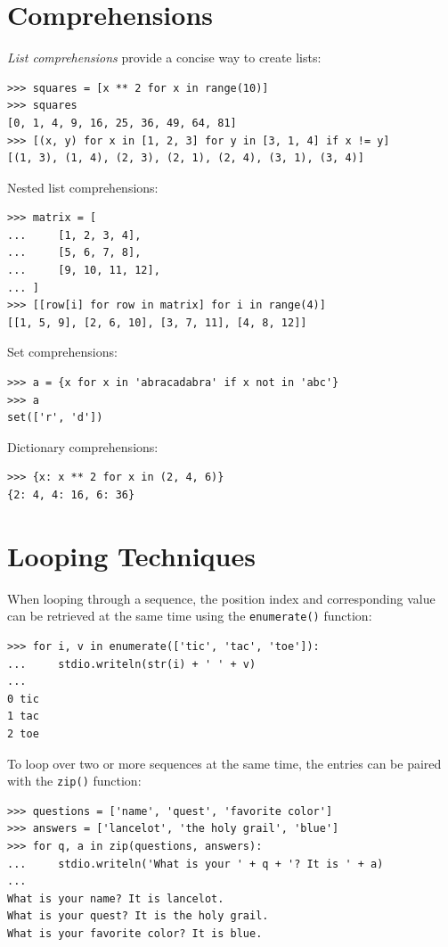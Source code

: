 \documentclass[8pt,a4paper,compress,handout]{beamer}
\begin{document}
\section{Comprehensions}
\begin{frame}[fragile]
\emph{List comprehensions} provide a concise way to create lists:
\begin{lstlisting}[language={}]
>>> squares = [x ** 2 for x in range(10)]
>>> squares
[0, 1, 4, 9, 16, 25, 36, 49, 64, 81]
>>> [(x, y) for x in [1, 2, 3] for y in [3, 1, 4] if x != y]
[(1, 3), (1, 4), (2, 3), (2, 1), (2, 4), (3, 1), (3, 4)]
\end{lstlisting}

\bigskip

Nested list comprehensions:
\begin{lstlisting}[language={}]
>>> matrix = [
...     [1, 2, 3, 4],
...     [5, 6, 7, 8],
...     [9, 10, 11, 12],
... ]
>>> [[row[i] for row in matrix] for i in range(4)]
[[1, 5, 9], [2, 6, 10], [3, 7, 11], [4, 8, 12]]
\end{lstlisting}

\bigskip

Set comprehensions:
\begin{lstlisting}[language={}]
>>> a = {x for x in 'abracadabra' if x not in 'abc'}
>>> a
set(['r', 'd'])
\end{lstlisting}

\bigskip

Dictionary comprehensions:
\begin{lstlisting}[language={}]
>>> {x: x ** 2 for x in (2, 4, 6)}
{2: 4, 4: 16, 6: 36}
\end{lstlisting}
\end{frame}

\section{Looping Techniques}
\begin{frame}[fragile]
When looping through a sequence, the position index and corresponding value can be retrieved at the same time using the \lstinline{enumerate()} function:
\begin{lstlisting}[language={}]
>>> for i, v in enumerate(['tic', 'tac', 'toe']):
...     stdio.writeln(str(i) + ' ' + v)
...
0 tic
1 tac
2 toe
\end{lstlisting}

\bigskip

To loop over two or more sequences at the same time, the entries can be paired with the \lstinline{zip()} function:
\begin{lstlisting}[language={}]
>>> questions = ['name', 'quest', 'favorite color']
>>> answers = ['lancelot', 'the holy grail', 'blue']
>>> for q, a in zip(questions, answers):
...     stdio.writeln('What is your ' + q + '? It is ' + a)
...
What is your name? It is lancelot.
What is your quest? It is the holy grail.
What is your favorite color? It is blue.
\end{lstlisting}
\end{frame}
\end{document}
